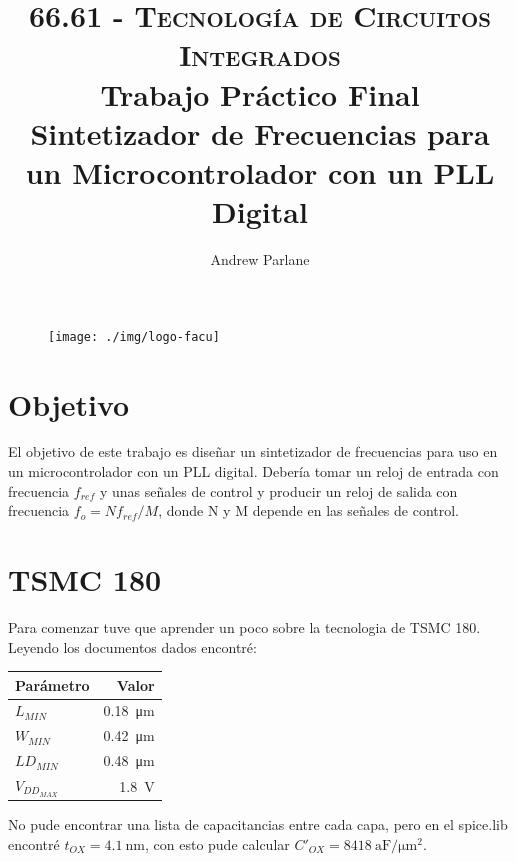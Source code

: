 \documentclass[a4paper]{article}
\begin{document}
\begin{figure}
\centering
\texttt{[image: ./img/logo-facu]}
\end{figure}

\title{\large\textsc{66.61 - Tecnología de Circuitos Integrados}\\
\large Trabajo Práctico Final\\
Sintetizador de Frecuencias para un Microcontrolador con un PLL Digital}

\author{
Andrew Parlane \\
}

\maketitle

\newpage

\tableofcontents

\listoffigures

\newpage

\section{Objetivo}

El objetivo de este trabajo es diseñar un sintetizador de frecuencias para uso en un microcontrolador con un PLL digital. Debería tomar un reloj de entrada con frecuencia $f_{ref}$ y unas señales de control y producir un reloj de salida con frecuencia $f_{o} = N f_{ref} / M$, donde N y M depende en las señales de control.

\section{TSMC 180}

Para comenzar tuve que aprender un poco sobre la tecnologia de TSMC 180. Leyendo los documentos dados encontré:

\begin{tabular}{l r}
    Parámetro & Valor \\ \hline
    $L_{MIN}$ & \SI{0.18}{\micro\meter} \\
    $W_{MIN}$ & \SI{0.42}{\micro\meter} \\
    $LD_{MIN}$ & \SI{0.48}{\micro\meter} \\
    $V_{DD_{MAX}}$ & \SI{1.8}{\volt} \\
\end{tabular}

No pude encontrar una lista de capacitancias entre cada capa, pero en el spice.lib encontré $t_{OX} = \SI{4.1}{\nano\meter}$, con esto pude calcular $C\prime_{OX} = \SI[per-mode=symbol]{8418}{\atto\farad\per\micro\meter\squared}$.
\end{document}
